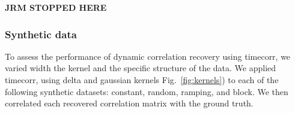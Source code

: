 \documentclass[english]{article}
\begin{document}
\textbf{JRM STOPPED HERE}





\subsubsection*{Synthetic data}



To assess the performance of dynamic correlation recovery using
timecorr, we varied width the kernel and the specific structure of the
data. We applied timecorr, using delta and gaussian kernels
Fig.~\ref{fig:kernels}) to each of the following  
synthetic datasets: constant, random, ramping, and block.  We then correlated each recovered
correlation matrix with the ground truth. 
\end{document}
